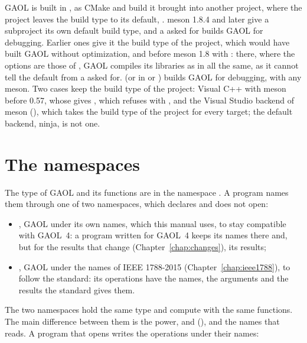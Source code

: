\documentclass[12pt,a4paper,twoside,openright]{book}
\begin{document}
\medskip
GAOL is built in , as CMake and  build it brought
into another project, where the project leaves the build type to its default,
. meson 1.8.4 and later give a subproject its own default build
type, and a  asked for builds GAOL for debugging.
Earlier ones give it the build type of the project, which would have built
GAOL without optimization, and before meson 1.8 with :
there, where the options are those of , GAOL compiles its
libraries as in  all the same, as it cannot tell the default
from a  asked for. 
(or  in  or
) builds GAOL for debugging, with any meson. Two cases keep
the build type of the project: Visual C++ with meson before 0.57, whose
 gives , which  refuses with ,
and the Visual Studio backend of meson (), which takes the
build type of the project for every target; the default backend, ninja, is not
one.\newinvfive

\section{The namespaces}\label{sec:namespaces}
%
%
%

The type  of GAOL and its functions are in the namespace
. A program names them through one of two namespaces, which
 declares and does not open:\newinvfive

\begin{itemize}
\item[$\bullet$] \textbf{}, GAOL under its own names, which this
  manual uses, to stay compatible with GAOL~4: a program written for GAOL~4
  keeps its names there and, but for the results that change
  (Chapter~\ref{chap:changes}), its results;
\item[$\bullet$] \textbf{}, GAOL under the names of IEEE
  1788-2015 (Chapter~\ref{chap:ieee1788}), to follow the standard: its
  operations have the names, the arguments and the results the standard gives
  them.
\end{itemize}

\noindent
The two namespaces hold the same type and compute with the same functions.
The main difference between them is the power,  and 
(), and the names that  reads.
A program that opens  writes the operations under their names:
\end{document}

